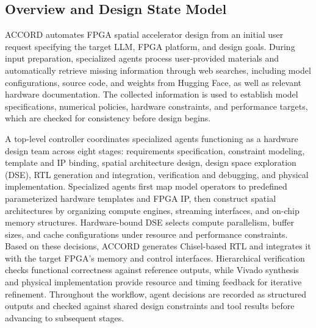 \documentclass[conference]{IEEEtran}
\begin{document}
\subsection{Overview and Design State Model}
ACCORD automates FPGA spatial accelerator design from an initial user request specifying the target LLM, FPGA platform, and design goals. During input preparation, specialized agents process user-provided materials and automatically retrieve missing information through web searches, including model configurations, source code\cite{transformers}, and weights from Hugging Face\cite{huggingfacehub}, as well as relevant hardware documentation. The collected information is used to establish model specifications, numerical policies, hardware constraints, and performance targets, which are checked for consistency before design begins.

A top-level controller coordinates specialized agents functioning as a hardware design team across eight stages: requirements specification, constraint modeling, template and IP binding, spatial architecture design, design space exploration (DSE), RTL generation and integration, verification and debugging, and physical implementation. Specialized agents first map model operators to predefined parameterized hardware templates and FPGA IP, then construct spatial architectures by organizing compute engines, streaming interfaces, and on-chip memory structures. Hardware-bound DSE selects compute parallelism, buffer sizes, and cache configurations under resource and performance constraints. Based on these decisions, ACCORD generates Chisel-based RTL and integrates it with the target FPGA's memory and control interfaces. Hierarchical verification checks functional correctness against reference outputs, while Vivado synthesis and physical implementation provide resource and timing feedback for iterative refinement. Throughout the workflow, agent decisions are recorded as structured outputs and checked against shared design constraints and tool results before advancing to subsequent stages.
\end{document}
